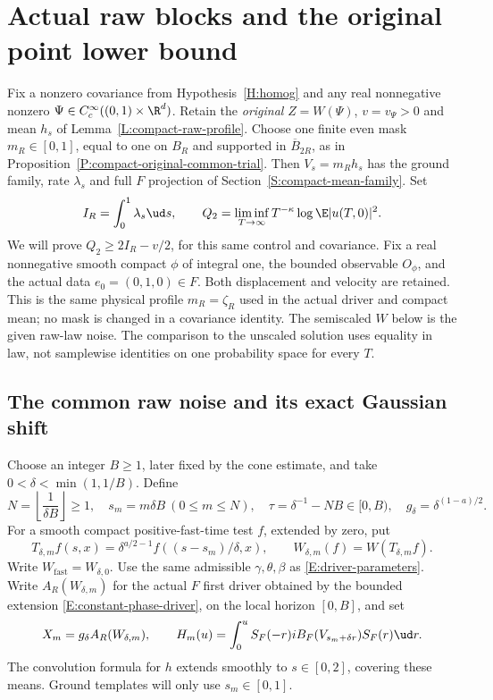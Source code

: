 \section{Actual raw blocks and the original point lower bound}
\label{S:actual-raw-block-lower}

Fix a nonzero covariance from Hypothesis~\ref{H:homog} and any real
nonnegative nonzero $\Psi\in C_c^\infty((0,1)\times\R^d)$.
Retain the \emph{original} $Z=W(\Psi)$, $v=v_\Psi>0$ and mean $h_s$
of Lemma~\ref{L:compact-raw-profile}. Choose one finite even mask
$m_R\in[0,1]$, equal to one on $B_R$ and supported in $\overline B_{2R}$,
as in Proposition~\ref{P:compact-original-common-trial}.
Then $V_s=m_Rh_s$ has the ground family, rate $\lambda_s$ and full
$F$ projection of Section~\ref{S:compact-mean-family}. Set
\[
  I_R=\int_0^1\lambda_s\ud s,\qquad
  Q_2=\liminf_{T\to\infty}T^{-\kappa}\log\E|u(T,0)|^2.
\]
We will prove $Q_2\ge2I_R-v/2$, for this same control and covariance.
Fix a real nonnegative smooth compact $\phi$ of integral one, the
bounded observable $O_\phi$, and the actual data $e_0=(0,1,0)\in F$.
Both displacement and velocity are retained.
This is the same physical profile $m_R=\zeta_R$ used in the actual
driver and compact mean; no mask is changed in a covariance identity.
The semiscaled $W$ below is the given raw-law noise. The comparison to
the unscaled solution uses equality in law, not samplewise identities
on one probability space for every $T$.

\subsection{The common raw noise and its exact Gaussian shift}

Choose an integer $B\ge1$, later fixed by the cone estimate, and take
$0<\delta<\min(1,1/B)$. Define
\begin{equation}\label{E:raw-block-clocks}
  N=\left\lfloor\frac1{\delta B}\right\rfloor\ge1,\quad
  s_m=m\delta B\ (0\le m\le N),\quad
  \tau=\delta^{-1}-NB\in[0,B),\quad
  g_\delta=\delta^{(1-a)/2}.
\end{equation}
For a smooth compact positive-fast-time test $f$, extended by zero,
put
\begin{equation}\label{E:raw-block-pullback}
  T_{\delta,m}f(s,x)
  =\delta^{a/2-1}f((s-s_m)/\delta,x),\qquad
  W_{\delta,m}(f)=W(T_{\delta,m}f).
\end{equation}
Write $W_{\mathrm{fast}}=W_{\delta,0}$.
Use the same admissible $\gamma,\theta,\beta$ as
\eqref{E:driver-parameters}. Write $A_R(W_{\delta,m})$ for the
actual $F$ first driver obtained by the bounded extension
\eqref{E:constant-phase-driver}, on the local horizon $[0,B]$, and set
\begin{equation}\label{E:raw-block-drivers}
  X_m=g_\delta A_R(W_{\delta,m}),\qquad
  H_m(u)=\int_0^uS_F(-r)iB_F(V_{s_m+\delta r})S_F(r)\ud r.
\end{equation}
The convolution formula for $h$ extends smoothly to $s\in[0,2]$,
covering these means. Ground templates will only use $s_m\in[0,1]$.

